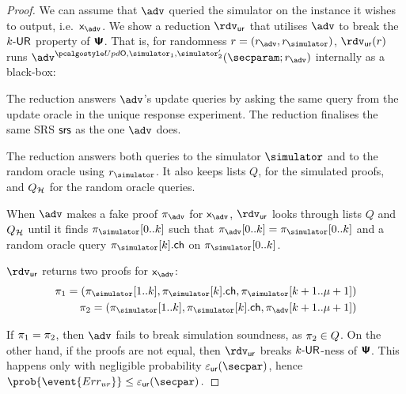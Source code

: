 \begin{proof}
  We can assume that $\adv$ queried the simulator on the instance it wishes to
  output, i.e.~$\inp_{\adv}$. We show a reduction $\rdvur$ that utilises $\adv$ to
  break the ${k\text{-}\mathsf{UR}}$ property of $\bm{\mathsf{\Psi}}$. That is, for randomness $r = (r_\adv, \rsim)$,
  $\rdvur (r)$ runs $\advse^{\initU, \simulator_1, \simulator_2'}(\secparam; r_\adv)$ internally as a black-box:
  \begin{compactitem}
  \item The reduction answers $\adv$'s update queries by asking the same query from the
    update oracle in the unique response experiment. The reduction finalises the same
    SRS $\mathsf{srs}$ as the one $\adv$ does.
  \item The reduction answers both queries to the simulator $\simulator$
      and to the random oracle using $\rsim$. It also keeps lists $Q$, for the simulated proofs,
      and $Q_{\mathcal{H}}$ for the random oracle queries.
  \item When $\adv$ makes a fake proof $\zkproof_{\adv}$ for $\inp_{\adv}$, $\rdvur$
    looks through lists $Q$ and $Q_{\mathcal{H}}$ until it finds $\zkproof_{\simulator}[0..k]$
    such that $\zkproof_{\adv}[0..k] = \zkproof_{\simulator}[0..k]$ and a random
    oracle query $\zkproof_{\simulator}[k].\ch$ on $\zkproof_{\simulator}[0..k]$.
  \item $\rdvur$ returns two proofs for $\inp_{\adv}$:
  	\begin{align*}
      \zkproof_1 = (\zkproof_{\simulator}[1..k],
      \zkproof_{\simulator}[k].\ch, \zkproof_{\simulator}[k + 1..\mu + 1])\\
      \zkproof_2 = (\zkproof_{\simulator}[1..k],
      \zkproof_{\simulator}[k].\ch, \zkproof_{\adv}[k + 1..\mu + 1])
  	\end{align*}
  \end{compactitem}
  If $\pi_1 = \pi_2$, then $\adv$ fails to break simulation soundness, as
  $\pi_2 \in Q$. On the other hand, if the proofs are not equal, then $\rdvur$
  breaks ${k\text{-}\mathsf{UR}}$-ness of $\bm{\mathsf{\Psi}}$. This happens only with negligible probability
  $\epsur(\secpar)$, hence \( \prob{\event{\errur}} \leq \epsur(\secpar)\,. \)

\end{proof}
